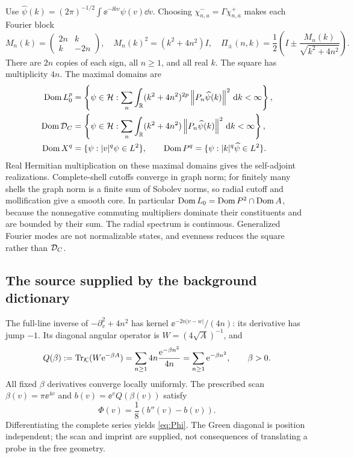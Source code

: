 Use $\widehat\psi(k)=(2\pi)^{-1/2}\int\ee^{-\ii kv}\psi(v)\dd v$.
Choosing $\chi^-_{n,a}=\Gamma\chi^+_{n,a}$ makes each Fourier block
\begin{equation}\label{eq:blocks}
 M_n(k)=\begin{pmatrix}2n&k\\k&-2n\end{pmatrix},\quad
 M_n(k)^2=(k^2+4n^2)I,\quad
 \Pi_\pm(n,k)=\frac12\left(I\pm\frac{M_n(k)}{\sqrt{k^2+4n^2}}\right).
\end{equation}
There are $2n$ copies of each sign, all $n\ge1$, and all real $k$.
The square has multiplicity $4n$. The maximal domains are
\begin{align}
 \operatorname{Dom} L_0^p&=\left\{\psi\in\mathcal H:
  \sum_n\int_\mathbb R(k^2+4n^2)^{2p}\left\lVert P_n\widehat\psi(k)\right\rVert^2\,\mathrm d k<\infty\right\},
 \label{eq:graphdomain}\\
 \operatorname{Dom}\mathcal D_C&=\left\{\psi\in\mathcal H:
  \sum_n\int_\mathbb R(k^2+4n^2)\left\lVert P_n\widehat\psi(k)\right\rVert^2\,\mathrm d k<\infty\right\},
 \label{eq:Diracdomain}\\
 \operatorname{Dom} X^q&=\{\psi:|v|^q\psi\in L^2\},\qquad
 \operatorname{Dom} P^q=\{\psi:|k|^q\widehat\psi\in L^2\}.
 \label{eq:XPdomain}
\end{align}
Real Hermitian multiplication on these maximal domains gives the
self-adjoint realizations. Complete-shell cutoffs converge in graph norm;
for finitely many shells the graph norm is a finite sum of Sobolev norms,
so radial cutoff and mollification give a smooth core. In particular
$\operatorname{Dom} L_0=\operatorname{Dom} P^2\cap\operatorname{Dom} A$, because the nonnegative commuting
multipliers dominate their constituents and are bounded by their sum.
The radial spectrum is continuous. Generalized Fourier modes are not
normalizable states, and evenness reduces the square rather than $\mathcal D_C$.

\subsection{The source supplied by the background dictionary}
The full-line inverse of $-\partial_v^2+4n^2$ has kernel
$\ee^{-2n|v-w|}/(4n)$: its derivative has jump $-1$.
Its diagonal angular operator is $W=(4\sqrt A)^{-1}$, and
\begin{equation}\label{eq:Q}
 Q(\beta):=\operatorname{Tr}_\mathcal K(W\mathrm e^{-\beta A})
 =\sum_{n\ge1}4n\frac{\mathrm e^{-\beta n^2}}{4n}
 =\sum_{n\ge1}\mathrm e^{-\beta n^2},\qquad\beta>0.
\end{equation}
All fixed $\beta$ derivatives converge locally uniformly. The prescribed
scan $\beta(v)=\pi\ee^{4v}$ and $b(v)=\ee^vQ(\beta(v))$ satisfy
\begin{equation}\label{eq:sourceconstruction}
 \Phi(v)=\frac18(b''(v)-b(v)).
\end{equation}
Differentiating the complete series yields \eqref{eq:Phi}. The Green diagonal
is position independent; the scan and imprint are supplied, not consequences
of translating a probe in the free geometry.

